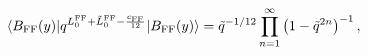 \begin{equation}
 \langle B_{\rm FF}(y) |
  q^{L_0^{\rm FF} + {\tilde L}_0^{\rm FF} - {c_{\rm FF} \over {12}}}
 | B_{\rm FF}(y) \rangle
 = {\tilde q}^{-1/12}
   \prod_{n=1}^\infty \left( 1 - {\tilde q}^{2n} \right)^{-1},
\end{equation}

